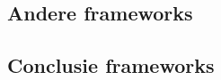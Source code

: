 \subsection{Andere frameworks}
\label{andereFrameworks}



\subsection{Conclusie frameworks}
\label{conclusieFrameworks}







